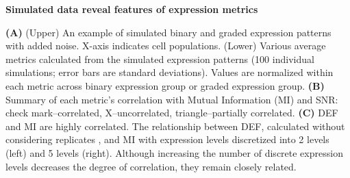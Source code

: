 \textbf{Simulated data reveal features of expression metrics}

\textbf{(A)} (Upper) An example of simulated binary and graded expression patterns with added noise. X-axis indicates cell populations. (Lower) Various average metrics calculated from the simulated expression patterns (100 individual simulations; error bars are standard deviations). Values are normalized within each metric across binary expression group or graded expression group. 
\textbf{(B)} Summary of each metric's correlation with Mutual Information (MI) and SNR: check mark--correlated, X--uncorrelated, triangle--partially correlated.
\textbf{(C)} DEF and MI are highly correlated. The relationship between DEF, calculated without considering replicates%
, and MI with expression levels discretized into 2 levels (left) and 5 levels (right). Although increasing the number of discrete expression levels decreases the degree of correlation, they remain closely related.

